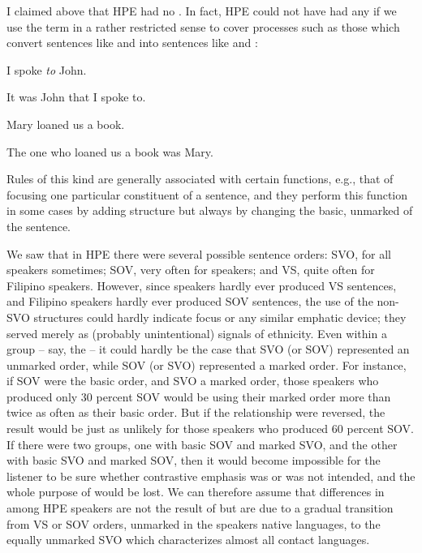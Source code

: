 I claimed above that HPE had no . In fact, HPE could not have had any  if we use the term in a rather restricted sense to cover processes such as those which convert sentences like  and  into sentences like  and :

\ea\label{ex:17}
 I spoke \textit{to} John.
\z

\ea\label{ex:18}
 It was John that I spoke to.
\glt 
\z

\ea\label{ex:19}
 Mary loaned us a book.
\glt 
\z

\ea\label{ex:20}
 The one who loaned us a book was Mary.
\glt 
\z

Rules of this kind are generally associated with certain functions, e.g.,
that of focusing one particular constituent of a sentence, and they perform this function in some  cases by adding structure but always by changing the basic, unmarked  of the sentence.

We saw that in HPE there were several possible sentence orders: SVO, for all speakers sometimes; SOV, very often for  speak\-ers; and VS, quite often for Filipino speakers. However, since  speakers hardly ever produced VS sentences, and Filipino speakers hardly ever produced SOV sentences, the use of the non-SVO structures could hardly indicate focus or any similar emphatic device; they served merely as (probably unintentional) signals of ethnicity. Even within a group -- say, the  -- it could hardly be the case that SVO (or SOV) represented an unmarked order, while SOV (or SVO) represented a marked order. For instance, if SOV were the basic order, and SVO a marked order, those speakers who produced only 30 percent SOV would be using their marked order more than twice as often as their basic order. But if the relationship were reversed, the result would be just as unlikely for those speakers who produced 60 percent SOV. If there were two groups, one with basic SOV and marked SVO, and the other with basic SVO and marked SOV, then it would become impossible for the listener to be sure whether contrastive emphasis was or was not intended, and the whole purpose of  would be lost. We can therefore assume that differences in  among HPE speakers are not the result of  but are due to a gradual transition from VS or SOV orders, unmarked in the speakers native languages, to the equally unmarked SVO which characterizes almost all contact languages.


